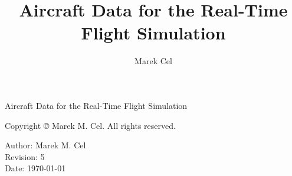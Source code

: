 \documentclass[12pt,a4paper]{report}
\title{Aircraft Data for the Real-Time Flight Simulation}
\author{Marek Cel}
\date{}
\begin{document}
  
  \begin{titlepage}
    \centering
    {\huge Aircraft Data for the Real-Time Flight Simulation\par}
  \end{titlepage}
  

  \noindent Copyright \copyright{} \the\year{} Marek M. Cel. All rights reserved.

  \noindent Author: Marek M. Cel \\
  Revision: 5 \\
  Date: \today

  
  
  {
    \clearpage
    \setlength{\parskip}{0em}
    \tableofcontents
  }

  
  
  
  
  
  
  
  \clearpage
   
  
  
\end{document}
